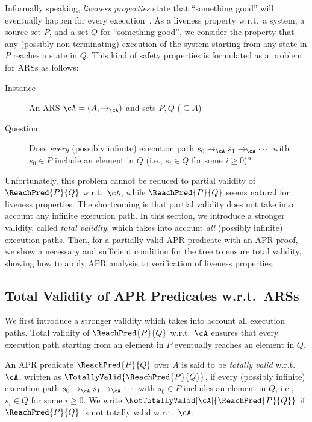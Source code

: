 Informally speaking, \emph{liveness properties} state that ``something good'' will eventually happen for every execution~\cite[Section~3.4]{BK08}.
As a liveness property w.r.t.\ a system, a source set $P$, and a set $Q$ for ``something good'', we consider the property that
any (possibly non-terminating) execution of the system starting from any state in $P$ reaches a state in $Q$.
This kind of safety properties is formulated as a problem for ARSs as follows:
\begin{description}
	\item[Instance] An ARS $\cA=(A,\to_\cA)$ and sets $P,Q$ ($\subseteq A$)
	\item[Question] Does \emph{every} (possibly infinite) execution path $s_0 \to_\cA s_1 \to_\cA \cdots$ with $s_0 \in P$ include an element in $Q$ (i.e., $s_i \in Q$ for some $i \geq 0$)?
\end{description}
Unfortunately, this problem cannot be reduced to partial validity of $\ReachPred{P}{Q}$ w.r.t.\ $\cA$, while $\ReachPred{P}{Q}$ seems natural for liveness properties.
The shortcoming is that partial validity does not take into account any infinite execution path.
In this section, we introduce a stronger validity, called \emph{total validity}, which takes into account \emph{all} (possibly infinite) execution paths.
Then, for a partially valid APR predicate with an APR proof, we show a necessary and sufficient condition for the tree to ensure total validity, showing how to apply APR analysis to verification of liveness properties.

\subsection{Total Validity of APR Predicates w.r.t.\ ARSs}
\label{subsec:total-validity}

We first introduce a stronger validity which takes into account all execution paths.
Total validity of $\ReachPred{P}{Q}$ w.r.t.\ $\cA$ ensures that every execution path starting from an element in $P$ eventually reaches an element in $Q$.
\begin{definition}
	An APR predicate $\ReachPred{P}{Q}$ over $A$ is said to be \emph{totally valid} w.r.t.\ $\cA$, written as $\TotallyValid{\ReachPred{P}{Q}}$, if
	every (possibly infinite) execution path $s_0 \to_\cA s_1 \to_\cA \cdots$ with $s_0 \in P$ includes an element in $Q$, i.e., $s_i \in Q$ for some $i \geq 0$.
	We write $\NotTotallyValid[\cA]{\ReachPred{P}{Q}}$ if $\ReachPred{P}{Q}$ is not totally valid w.r.t.\ $\cA$.
\end{definition}

